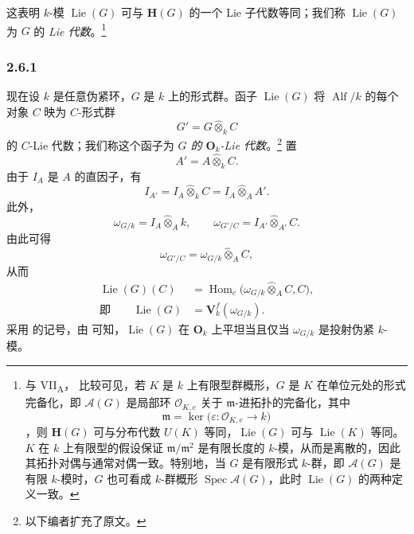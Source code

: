 这表明 \(k\)-模 \(\operatorname{Lie}(G)\) 可与 \(\mathbf H(G)\) 的一个 Lie 子代数等同；我们称 \(\operatorname{Lie}(G)\) 为 \(G\) 的 \emph{Lie 代数}。\footnote{\label{sga3:VIIB:nde:108}与 VII\textsubscript{A}， 比较可见，若 \(K\) 是 \(k\) 上有限型群概形，\(G\) 是 \(K\) 在单位元处的形式完备化，即 \(\mathcal A(G)\) 是局部环 \(\mathcal O_{K,e}\) 关于 \(\mathfrak m\)-进拓扑的完备化，其中
\[
  \mathfrak m=\ker\bigl(
    \varepsilon:\mathcal O_{K,e}\longrightarrow k
  \bigr)
\]
，则 \(\mathbf H(G)\) 可与分布代数 \(U(K)\) 等同，\(\operatorname{Lie}(G)\) 可与 \(\operatorname{Lie}(K)\) 等同。\(K\) 在 \(k\) 上有限型的假设保证 \(\mathfrak m/\mathfrak m^2\) 是有限长度的 \(k\)-模，从而是离散的，因此其拓扑对偶与通常对偶一致。特别地，当 \(G\) 是有限形式 \(k\)-群，即 \(\mathcal A(G)\) 是有限 \(k\)-模时，\(G\) 也可看成 \(k\)-群概形 \(\operatorname{Spec}\mathcal A(G)\)，此时 \(\operatorname{Lie}(G)\) 的两种定义一致。}
\subsubsection*{2.6.1}
\label{sga3:VIIB:2.6.1}
现在设 \(k\) 是任意伪紧环，\(G\) 是 \(k\) 上的形式群。函子 \(\operatorname{Lie}(G)\) 将 \(\operatorname{Alf}/k\) 的每个对象 \(C\) 映为 \(C\)-形式群
\[
  G'=G\widehat\otimes_k C
\]
的 \(C\)-Lie 代数；我们称这个函子为 \emph{\(G\) 的 \(\mathbf O_k\)-Lie 代数}。\footnote{%
\label{sga3:VIIB:nde:109}以下编者扩充了原文。}
置
\[
  A'=A\widehat\otimes_k C.
\]
由于 \(I_A\) 是 \(A\) 的直因子，有
\[
  I_{A'}
  =
  I_A\widehat\otimes_k C
  =
  I_A\widehat\otimes_A A'.
\]
此外，
\[
  \omega_{G/k}=I_A\widehat\otimes_A k,
  \qquad
  \omega_{G'/C}=I_{A'}\widehat\otimes_{A'}C.
\]
由此可得
\[
  \omega_{G'/C}
  =
  \omega_{G/k}\widehat\otimes_A C,
\]
从而
\[
\begin{aligned}
  \operatorname{Lie}(G)(C)
  &=
  \operatorname{Hom}_c\bigl(
    \omega_{G/k}\widehat\otimes_A C,C
  \bigr),
  \\
  \text{即}\qquad
  \operatorname{Lie}(G)
  &=
  \mathbf V_k^f(\omega_{G/k}).
\end{aligned}
\]
采用  的记号，由 可知，\(\operatorname{Lie}(G)\) 在 \(\mathbf O_k\) 上平坦当且仅当 \(\omega_{G/k}\) 是投射伪紧 \(k\)-模。
